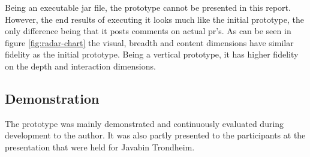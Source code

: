 \documentclass[pdftex,10pt,b5paper,twoside]{report}
\begin{document}
Being an executable jar file, the prototype cannot be presented in this report. However, the end results of executing it looks much like the initial prototype, the only difference being that it posts comments on actual \gls{pr}'s. As can be seen in figure \ref{fig:radar-chart} the visual, breadth and content dimensions have similar fidelity as the initial prototype. Being a vertical prototype, it has higher fidelity on the depth and interaction dimensions.  

\subsection*{Demonstration}
The prototype was mainly demonstrated and continuously evaluated during development to the author. It was also partly presented to the participants at the presentation that were held for Javabin Trondheim.
\end{document}
